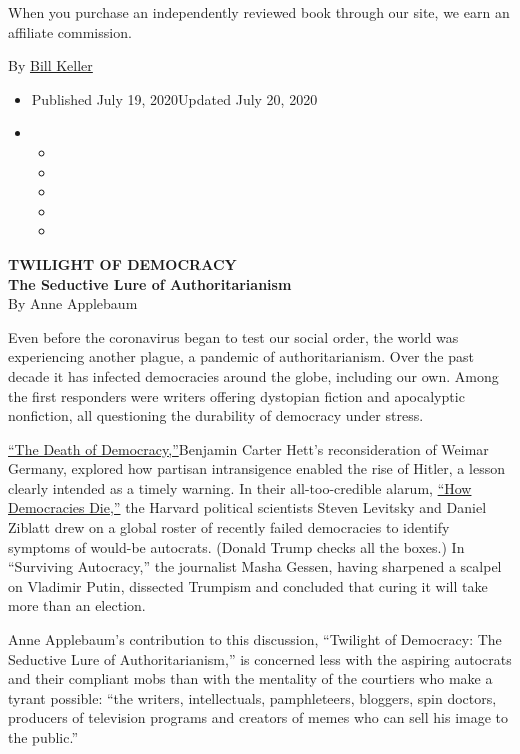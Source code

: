 When you purchase an independently reviewed book through our site, we
earn an affiliate commission.

By
\href{https://topics.nytimes3xbfgragh.onion/top/reference/timestopics/people/k/bill_keller/index.html}{Bill
Keller}

\begin{itemize}
\item
  Published July 19, 2020Updated July 20, 2020
\item
  \begin{itemize}
  \item
  \item
  \item
  \item
  \item
  \end{itemize}
\end{itemize}

\textbf{TWILIGHT OF DEMOCRACY}\\
\textbf{The Seductive Lure of Authoritarianism}\\
By Anne Applebaum

Even before the coronavirus began to test our social order, the world
was experiencing another plague, a pandemic of authoritarianism. Over
the past decade it has infected democracies around the globe, including
our own. Among the first responders were writers offering dystopian
fiction and apocalyptic nonfiction, all questioning the durability of
democracy under stress.

\href{https://www.nytimes3xbfgragh.onion/2018/06/14/books/review/benjamin-carter-hett-death-of-democracy.html}{``The
Death of Democracy,''}Benjamin Carter Hett's reconsideration of Weimar
Germany, explored how partisan intransigence enabled the rise of Hitler,
a lesson clearly intended as a timely warning. In their all-too-credible
alarum,
\href{https://www.nytimes3xbfgragh.onion/2018/01/10/books/review-trumpocracy-david-frum-how-democracies-die-steven-levitsky-daniel-ziblatt.html}{``How
Democracies Die,''} the Harvard political scientists Steven Levitsky and
Daniel Ziblatt drew on a global roster of recently failed democracies to
identify symptoms of would-be autocrats. (Donald Trump checks all the
boxes.) In ``Surviving Autocracy,'' the journalist Masha Gessen, having
sharpened a scalpel on Vladimir Putin, dissected Trumpism and concluded
that curing it will take more than an election.

Anne Applebaum's contribution to this discussion, ``Twilight of
Democracy: The Seductive Lure of Authoritarianism,'' is concerned less
with the aspiring autocrats and their compliant mobs than with the
mentality of the courtiers who make a tyrant possible: ``the writers,
intellectuals, pamphleteers, bloggers, spin doctors, producers of
television programs and creators of memes who can sell his image to the
public.''

